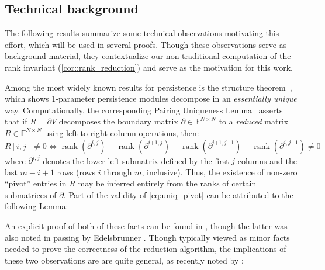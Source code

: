 \documentclass[pdflatex,sn-mathphys-num]{sn-jnl}
\begin{document}
\subsection{Technical background}\label{sec:betti_derivation}
The following results summarize some technical observations motivating this effort, which will be used in several proofs. Though these observations serve as background material, they contextualize our non-traditional computation of the rank invariant (\ref{cor::rank_reduction}) and serve as the motivation for this work.

Among the most widely known results for persistence is the structure theorem~\cite{zomorodian2004computing}, which shows 1-parameter persistence modules decompose in an \emph{essentially unique} way. Computationally, the corresponding Pairing Uniqueness Lemma~\cite{cohen2006vines} asserts that if \(R = \partial V\) decomposes the boundary matrix \(\partial \in \mathbb{F}^{N \times N}\) to a \emph{reduced} matrix \(R \in \mathbb{F}^{N \times N}\) using left-to-right column operations, then:
\begin{equation*}
	R [ i,j]  \neq 0 \Leftrightarrow \operatorname{rank} \left( \partial^{i,j} \right)  - \operatorname{rank} \left( \partial^{i\mathtt{+}1,j} \right)  + \operatorname{rank} \left( \partial^{i\mathtt{+}1,j\mathrm{-}1} \right)  - \operatorname{rank} \left( \partial^{i,j\mathrm{-}1} \right)  \neq 0
\end{equation*}\label{eq:uniq_pivot}
\noindent
where \(\partial^{i,j}\) denotes the lower-left submatrix defined by the first \(j\) columns and the last \(m - i + 1\) rows (rows \(i\) through \(m\), inclusive). Thus, the existence of non-zero ``pivot'' entries in \(R\) may be inferred entirely from the ranks of certain submatrices of \(\partial\). Part of the validity of \ref{eq:uniq_pivot} can be attributed to the following Lemma:

%
%


An explicit proof of both of these facts can be found in \cite{dey2022computational}, though the latter was also noted in passing by Edelsbrunner \cite{edelsbrunner2000topological}. Though typically viewed as minor facts needed to prove the correctness of the reduction algorithm, the implications of these two observations are are quite general, as recently noted by \cite{bauer2022keeping}:
\end{document}

